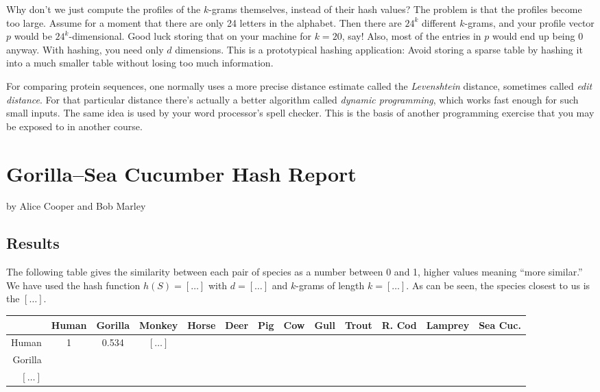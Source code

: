 \documentclass{tufte-handout}
\begin{document}
Why don't we just compute the profiles of the $k$-grams themselves, instead of their hash values?
The problem is that the profiles become too large.
Assume for a moment that there are only 24 letters in the alphabet.
Then there are $24^k$ different $k$-grams, and your profile vector $p$ would be $24^k$-dimensional.
Good luck storing that on your machine for $k=20$, say!
Also, most of the entries in $p$ would end up being $0$ anyway.
With hashing, you need only $d$ dimensions.
This is a prototypical hashing application:
Avoid storing a sparse table by hashing it into a much smaller table without losing too much information.

\medskip
For comparing protein sequences, one normally uses a more
precise distance estimate called the \emph{Levenshtein} distance,
sometimes called \emph{edit distance}.
For that particular distance there's actually a better algorithm called \emph{dynamic
programming}, which works fast enough for such small inputs.
The same idea is used by your word processor’s spell
checker.
This is the basis of another programming exercise that you may be exposed to in another course.

\newpage
\section{Gorilla--Sea Cucumber Hash Report}

by Alice Cooper and Bob Marley

  \subsection{Results}

  The following table gives the similarity between each pair of species as a number between 0 and 1, higher values meaning ``more similar.''
  We have used the hash function $h(S) = [\ldots]$ with  $d=[\ldots]$ and $k$-grams of length $k=[\ldots]$.
  As can be seen, the species closest to us is the $[\ldots]$.

  \bigskip\noindent
  {\small\sf
  \begin{tabular}{rcccccccccccc}
  \toprule
    &Human
    &Gorilla
    &Monkey
    &Horse
    &Deer
    &Pig
    &Cow
    &Gull
    &Trout
    &R. Cod
    &Lamprey
    &Sea Cuc.
    \\\midrule
  Human & 1 & 0.534 & $[\ldots]$ \\
  Gorilla &\\
  $[\ldots]$\\
  \bottomrule
  \end{tabular}
  }
\end{document}

